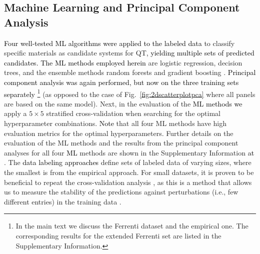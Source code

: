\documentclass[superscriptaddress,unsortedaddress,
 amsmath,amssymb,
 aps,
]{revtex4-2}
\newcommand{\mrk}[1]{\textcolor{black}{#1}}
\begin{document}

\subsection*{Machine Learning and Principal Component Analysis}
\mrk{Four well-tested ML algorithms were applied to the labeled data} to classify specific materials as candidate systems for QT\mrk{, yielding multiple sets of predicted candidates. The ML methods employed herein} are logistic regression, decision trees, and the ensemble methods random forests and gradient boosting \cite{Mehta2019,Hastie2009,Murphy2012}. 
\mrk{Principal component analysis was again performed, but now on the three training sets separately} \footnote{In the main text we discuss the Ferrenti dataset and the empirical one. The corresponding results for the extended Ferrenti set are listed in the Supplementary Information.}
(as opposed to the case of Fig.~\ref{fig:2dscatterplotpca} where all panels are based on the same model). 
Next, in the evaluation of the \mrk{ML methods we}  
apply a $5\times 5$ stratified cross-validation \cite{Hastie2009} when searching for the optimal hyperparameter combinations. \mrk{Note} that all four ML methods have high evaluation metrics for the optimal hyperparameters. Further details on the evaluation of the ML methods and the results from the principal component analyses for all four \mrk{ML} methods are shown in the Supplementary Information \mrk{at} \cite{supplementary}.  
The \mrk{data labeling approaches} define sets of labeled data of varying sizes, where the smallest is from the empirical approach. For small datasets, it is proven to be beneficial to repeat the cross-validation analysis \cite{Hastie2009}, as this is a method that allows us to measure the stability of the predictions against perturbations (i.e., few different entries) in the training data \cite{Beleites2008}.
\end{document}
